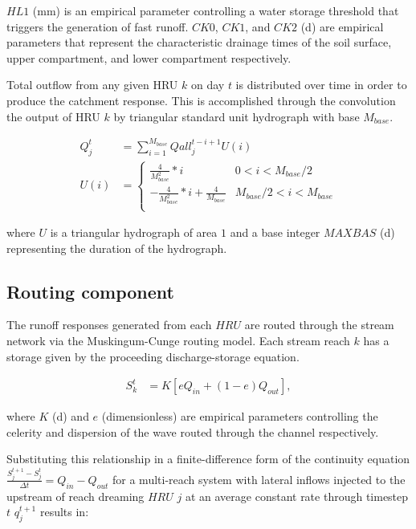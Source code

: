 \noindent $HL1$ (\si{\milli\meter}) is an empirical parameter controlling a water storage threshold that triggers the generation of fast runoff. $CK0$, $CK1$, and $CK2$ (\si{\day}) are empirical parameters that represent the characteristic drainage times of the soil surface, upper compartment, and lower compartment respectively.

Total outflow from any given HRU $k$ on day $t$ is distributed over time in order to produce the catchment response. This is accomplished through the convolution the output of HRU $k$ by triangular standard unit hydrograph with base $M_{base}$.

\begin{align}
Q_j^t &= \sum_{i=1}^{M_{base}} Qall_j^{t-i+1} U(i) \\
U(i) &= \left\{
\begin{array}{ll}
\frac{4}{M_{base}^2}*i & 0 < i < M_{base}/2 \\
-\frac{4}{M_{base}^2}*i + \frac{4}{M_{base}} &  M_{base}/2 < i < M_{base} \\
\end{array}
\right.
\end{align}

\noindent where $U$ is a triangular hydrograph of area $1$ and a base integer $MAXBAS$ (\si{\day}) representing the duration of the hydrograph.

\subsection{Routing component}

The runoff responses generated from each $HRU$ are routed through the stream network via the Muskingum-Cunge routing model. Each stream reach $k$ has a storage given by the proceeding discharge-storage equation.

\begin{align}
S_k^t &= K\left[eQ_{in} + (1 - e)Q_{out} \right],
\end{align}

where $K$ (\si{\day}) and $e$ (dimensionless) are empirical parameters controlling the celerity and dispersion of the wave routed through the channel respectively.

Substituting this relationship in a finite-difference form of the continuity equation $\frac{S_j^{t+1} - S_j^{t}}{\Delta t} = Q_{in} - Q_{out}$ for a multi-reach system with lateral inflows injected to the upstream of reach dreaming $HRU$ $j$ at an average constant rate through timestep $t$ $q_{j}^{t+1}$ results in:

